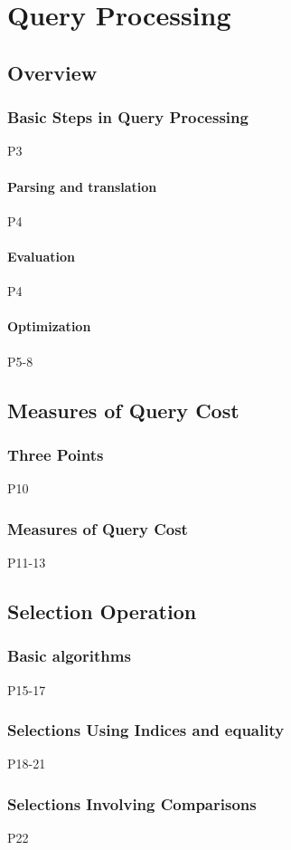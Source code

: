 \newpage
\section{Query Processing}
\subsection{Overview}
\subsubsection{Basic Steps in Query Processing}
 P3
\paragraph{Parsing and translation}
 P4
\paragraph{Evaluation}
 P4
\paragraph{Optimization}
 P5-8

\subsection{Measures of Query Cost}
\subsubsection{Three Points}
 P10
\subsubsection{Measures of Query Cost}
 P11-13

\subsection{Selection Operation}
\subsubsection{Basic algorithms}
 P15-17
\subsubsection{Selections Using Indices and equality}
 P18-21
\subsubsection{Selections Involving Comparisons}
 P22
